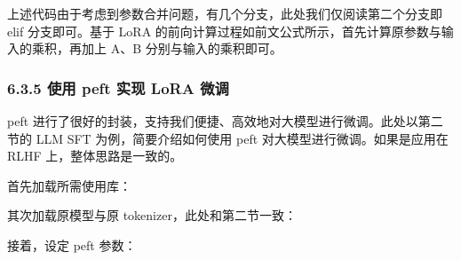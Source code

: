 \documentclass[12pt,a4paper]{book}
\begin{document}
上述代码由于考虑到参数合并问题，有几个分支，此处我们仅阅读第二个分支即
elif 分支即可。基于 LoRA
的前向计算过程如前文公式所示，首先计算原参数与输入的乘积，再加上 A、B
分别与输入的乘积即可。

\subsubsection{6.3.5 使用 peft 实现 LoRA
微调}\label{ux4f7fux7528-peft-ux5b9eux73b0-lora-ux5faeux8c03}

peft
进行了很好的封装，支持我们便捷、高效地对大模型进行微调。此处以第二节的
LLM SFT 为例，简要介绍如何使用 peft 对大模型进行微调。如果是应用在 RLHF
上，整体思路是一致的。

首先加载所需使用库：

\begin{Shaded}
\begin{Highlighting}[]
\end{Highlighting}
\end{Shaded}

其次加载原模型与原 tokenizer，此处和第二节一致：

\begin{Shaded}
\begin{Highlighting}[]
\OperatorTok{=}\OperatorTok{=}\NormalTok{)}
\OperatorTok{=}
\OperatorTok{=}
\NormalTok{)}
\end{Highlighting}
\end{Shaded}

接着，设定 peft 参数：

\begin{Shaded}
\begin{Highlighting}[]
\OperatorTok{=}
\OperatorTok{=}
\OperatorTok{=}\NormalTok{,}
\OperatorTok{=}\NormalTok{,}
\OperatorTok{=}\NormalTok{,}
\OperatorTok{=}\NormalTok{,}
\NormalTok{        )}
\end{Highlighting}
\end{Shaded}
\end{document}
